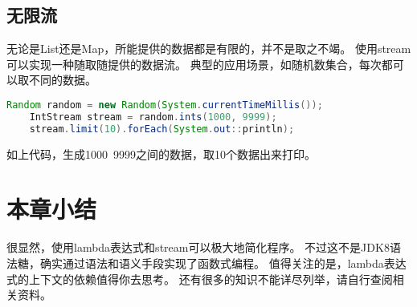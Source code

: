 \subsection{无限流}
无论是List还是Map，所能提供的数据都是有限的，并不是取之不竭。
使用stream可以实现一种随取随提供的数据流。
典型的应用场景，如随机数集合，每次都可以取不同的数据。

\begin{lstlisting}[language=Java]
	Random random = new Random(System.currentTimeMillis());
	IntStream stream = random.ints(1000, 9999);
	stream.limit(10).forEach(System.out::println);
\end{lstlisting}
\noindent
如上代码，生成1000~9999之间的数据，取10个数据出来打印。

\section{本章小结}
很显然，使用lambda表达式和stream可以极大地简化程序。
不过这不是JDK8语法糖，确实通过语法和语义手段实现了函数式编程。
值得关注的是，lambda表达式的上下文的依赖值得你去思考。
还有很多的知识不能详尽列举，请自行查阅相关资料。